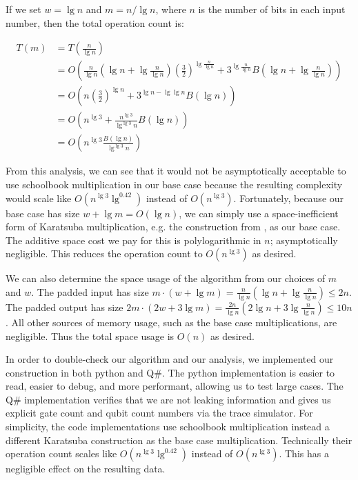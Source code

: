 \documentclass[onecolumn]{quantumarticle}
\begin{document}
If we set $w=\lg n$ and $m=n/\lg n$, where $n$ is the number of bits in each input number, then the total operation count is:

\begin{equation}
    \begin{aligned}
T(m) &= T\left(\frac{n}{\lg n}\right)
\\   &= O\left(\frac{n}{\lg n} \left(\lg n + \lg \frac{n}{\lg n}\right) \left(\frac{3}{2}\right)^{\lg \frac{n}{\lg n}} + 3^{\lg \frac{n}{\lg n}} B\left(\lg n + \lg \frac{n}{\lg n}\right)\right)
\\   &= O\left(n \left(\frac{3}{2}\right)^{\lg n} + 3^{\lg n - \lg \lg n} B(\lg n)\right)
\\   &= O\left(n^{\lg 3} + \frac{n^{\lg 3}}{\lg^{\lg 3} n} B(\lg n)\right)
\\   &= O\left(n^{\lg 3} \frac{B(\lg n)}{\lg^{\lg 3} n}\right)
    \end{aligned}
\end{equation}

From this analysis, we can see that it would not be asymptotically acceptable to use schoolbook multiplication in our base case because the resulting complexity would scale like $O(n^{\lg 3} \lg^{0.42})$ instead of $O(n^{\lg 3})$.
Fortunately, because our base case has size $w + \lg m = O(\lg n)$, we can simply use a space-inefficient form of Karatsuba multiplication, e.g. the construction from \cite{parent2017karatsuba}, as our base case.
The additive space cost we pay for this is polylogarithmic in $n$; asymptotically negligible.
This reduces the operation count to $O(n^{\lg 3})$ as desired.

We can also determine the space usage of the algorithm from our choices of $m$ and $w$.
The padded input has size $m \cdot (w + \lg m) = \frac{n}{\lg n} (\lg n + \lg \frac{n}{\lg n}) \leq 2 n$.
The padded output has size $2m \cdot (2w + 3 \lg m) = \frac{2n}{\lg n} (2 \lg n + 3 \lg \frac{n}{\lg n}) \leq 10 n$.
All other sources of memory usage, such as the base case multiplications, are negligible.
Thus the total space usage is $O(n)$ as desired.

In order to double-check our algorithm and our analysis, we implemented our construction in both python and Q\#.
The python implementation is easier to read, easier to debug, and more performant, allowing us to test large cases.
The Q\# implementation verifies that we are not leaking information and gives us explicit gate count and qubit count numbers via the trace simulator.
For simplicity, the code implementations use schoolbook multiplication instead a different Karatsuba construction as the base case multiplication.
Technically their operation count scales like $O(n^{\lg 3} \lg^{0.42})$ instead of $O(n^{\lg 3})$.
This has a negligible effect on the resulting data.
\end{document}
